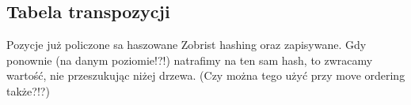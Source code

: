 \subsection{Tabela transpozycji}
\label{subsec:tabela-transpozycji}

{
    \color{red}
    \large Pozycje już policzone sa haszowane Zobrist hashing oraz zapisywane.
    Gdy ponownie (na danym poziomie!?!) natrafimy na ten sam hash, to zwracamy wartość, nie przeszukując niżej drzewa.
    (Czy można tego użyć przy move ordering także?!?)
}